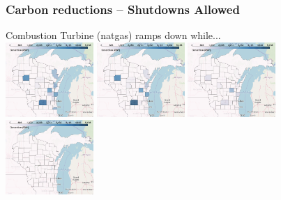 \documentclass[xcolor=dvipsnames]{beamer}
\begin{document}
\begin{frame}
  \frametitle{Carbon reductions -- Shutdowns Allowed}
  Combustion Turbine (natgas) ramps down while... \\
  \includegraphics[width=0.25\textwidth]{includes/no_leakage_shutdowns_CT_r0.png}
  \includegraphics[width=0.25\textwidth]{includes/no_leakage_shutdowns_CT_r2.png}
  \includegraphics[width=0.25\textwidth]{includes/no_leakage_shutdowns_CT_r3.png}
  \includegraphics[width=0.25\textwidth]{includes/no_leakage_shutdowns_CT_r4.png}


\end{frame}
\end{document}
